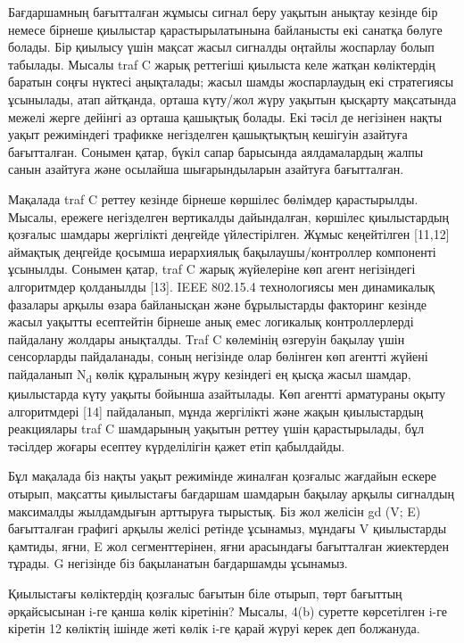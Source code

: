  

Бағдаршамның бағытталған жұмысы сигнал беру уақытын анықтау кезінде бір
немесе бірнеше қиылыстар қарастырылатынына байланысты екі санатқа бөлуге
болады. Бір қиылысу үшін мақсат жасыл сигналды оңтайлы жоспарлау болып
табылады. Мысалы traf C жарық реттегіші қиылыста келе жатқан көліктердің
баратын соңғы нүктесі аңықталады; жасыл шамды жоспарлаудың екі
стратегиясы ұсынылады, атап айтқанда, орташа күту/жол жүру уақытын
қысқарту мақсатында межелі жерге дейінгі аз орташа қашықтық болады. Екі
тәсіл де негізінен нақты уақыт режиміндегі трафикке негізделген
қашықтықтың кешігуін азайтуға бағытталған. Сонымен қатар, бүкіл сапар
барысында аялдамалардың жалпы санын азайтуға және осылайша
шығарындыларын азайтуға бағытталған.

Мақалада traf C реттеу кезінде бірнеше көршілес бөлімдер қарастырылды.
Мысалы, ережеге негізделген вертикалды дайындалған, көршілес
қиылыстардың қозғалыс шамдары жергілікті деңгейде үйлестірілген. Жұмыс
кеңейтілген {[}11,12{]} аймақтық деңгейде қосымша иерархиялық
бақылаушы/контроллер компоненті ұсынылды. Сонымен қатар, traf C жарық
жүйелеріне көп агент негізіндегі алгоритмдер қолданылды {[}13{]}. IEEE
802.15.4 технологиясы мен динамикалық фазалары арқылы өзара байланысқан
және бұрылыстарды факторинг кезінде жасыл уақытты есептейтін бірнеше
анық емес логикалық контроллерлерді пайдалану жолдары анықталды. Тraf C
көлемінің өзгеруін бақылау үшін сенсорларды пайдаланады, соның негізінде
олар бөлінген көп агентті жүйені пайдаланып N\textsubscript{d} көлік
құралының жүру кезіндегі ең қысқа жасыл шамдар, қиылыстарда күту уақыты
бойынша азайтылады. Көп агентті арматураны оқыту алгоритмдері {[}14{]}
пайдаланып, мұнда жергілікті және жақын қиылыстардың реакциялары traf C
шамдарының уақытын реттеу үшін қарастырылады, бұл тәсілдер жоғары
есептеу күрделілігін қажет етіп қабылдайды.

Бұл мақалада біз нақты уақыт режимінде жиналған қозғалыс жағдайын ескере
отырып, мақсатты қиылыстағы бағдаршам шамдарын бақылау арқылы сигналдың
максималды жылдамдығын арттыруға тырыстық. Біз жол желісін gd (V; E)
бағытталған графигі арқылы желісі ретінде ұсынамыз, мұндағы V
қиылыстарды қамтиды, яғни, E жол сегменттерінен, яғни арасындағы
бағытталған жиектерден тұрады. G негізінде біз бақыланатын бағдаршамды
ұсынамыз.

Қиылыстағы көліктердің қозғалыс бағытын біле отырып, төрт бағыттың
әрқайсысынан i-ге қанша көлік кіретінін? Мысалы, 4(b) суретте
көрсетілген i-ге кіретін 12 көліктің ішінде жеті көлік i-ге қарай жүруі
керек деп болжануда.

